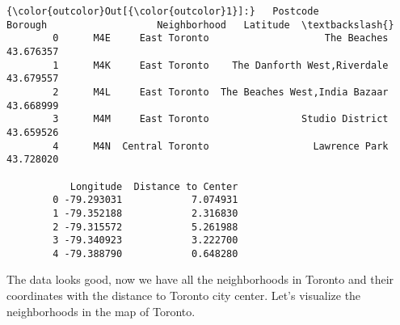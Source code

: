 \documentclass[11pt]{article}
\begin{document}
\begin{Verbatim}[commandchars=\\\{\}]
{\color{outcolor}Out[{\color{outcolor}1}]:}   Postcode          Borough                   Neighborhood   Latitude  \textbackslash{}
        0      M4E     East Toronto                    The Beaches  43.676357   
        1      M4K     East Toronto    The Danforth West,Riverdale  43.679557   
        2      M4L     East Toronto  The Beaches West,India Bazaar  43.668999   
        3      M4M     East Toronto                Studio District  43.659526   
        4      M4N  Central Toronto                  Lawrence Park  43.728020   
        
           Longitude  Distance to Center  
        0 -79.293031            7.074931  
        1 -79.352188            2.316830  
        2 -79.315572            5.261988  
        3 -79.340923            3.222700  
        4 -79.388790            0.648280  
\end{Verbatim}
            
    The data looks good, now we have all the neighborhoods in Toronto and
their coordinates with the distance to Toronto city center. Let's
visualize the neighborhoods in the map of Toronto.
\end{document}

